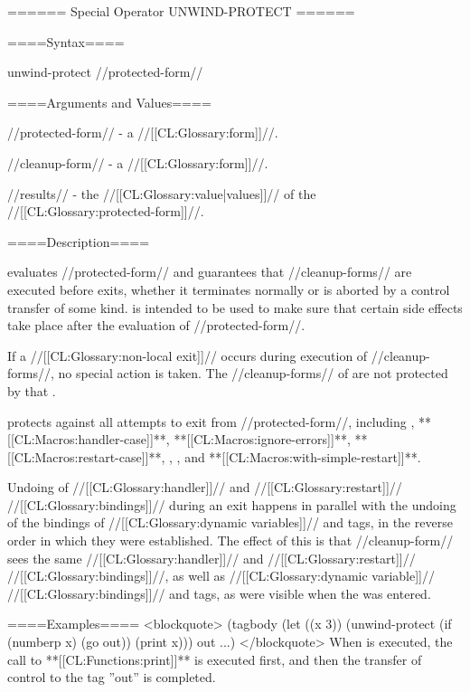 ====== Special Operator UNWIND-PROTECT ======

====Syntax====

\DefspecWithValues unwind-protect {//protected-form// } {}

====Arguments and Values====

//protected-form// - a //[[CL:Glossary:form]]//.

//cleanup-form// - a //[[CL:Glossary:form]]//.

//results// - the //[[CL:Glossary:value|values]]// of the //[[CL:Glossary:protected-form]]//.

====Description====

 evaluates //protected-form// and guarantees that //cleanup-forms// are executed before  exits, whether it terminates normally or is aborted by a control transfer of some kind.  is intended to be used to make sure that certain side effects take place after the evaluation of //protected-form//.

If a //[[CL:Glossary:non-local exit]]// occurs during execution of //cleanup-forms//, no special action is taken. The //cleanup-forms// of  are not protected by that .

 protects against all attempts to exit from //protected-form//, including , **[[CL:Macros:handler-case]]**, **[[CL:Macros:ignore-errors]]**, **[[CL:Macros:restart-case]]**, , , and **[[CL:Macros:with-simple-restart]]**.

Undoing of //[[CL:Glossary:handler]]// and //[[CL:Glossary:restart]]// //[[CL:Glossary:bindings]]// during an exit happens in parallel with the undoing of the bindings of //[[CL:Glossary:dynamic variables]]// and  tags, in the reverse order in which they were established. The effect of this is that //cleanup-form// sees the same //[[CL:Glossary:handler]]// and //[[CL:Glossary:restart]]// //[[CL:Glossary:bindings]]//, as well as //[[CL:Glossary:dynamic variable]]// //[[CL:Glossary:bindings]]// and  tags, as were visible when the  was entered.

====Examples==== <blockquote> (tagbody (let ((x 3)) (unwind-protect (if (numberp x) (go out)) (print x))) out ...) </blockquote> When  is executed, the call to **[[CL:Functions:print]]** is executed first, and then the transfer of control to the tag ''out'' is completed.

